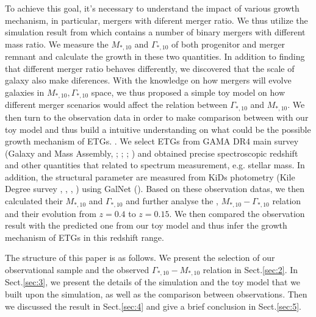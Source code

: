 \documentclass[fleqn,usenatbib]{mnras}
\begin{document}
\par To achieve this goal, it's necessary to understand the impact of various growth mechanism, in particular, mergers with diferent merger ratio.
 We thus utilize the simulation result from \cite{nipoti2009} which contains a number of binary mergers with different mass ratio. We measure the $M_{*,10}$ and $\Gamma_{*,10}$ of both progenitor and merger remnant and calculate the growth in these two quantities. In addition to finding that different merger ratio behaves differently, we discovered that the scale of galaxy also make diferences. With the knowledge on how mergers will evolve galaxies in $M_{*,10}, \Gamma_{*,10}$ space, we thus proposed a simple toy model on how different merger scenarios would affect the relation between $\Gamma_{*,10}$ and $M_{*,10}$. We then turn to the observation data in order to make comparison between with our toy model and thus build a intuitive understanding on what could be the possible growth mechanism of ETGs. 
 . We select ETGs from GAMA DR4 main survey (Galaxy and Mass Assembly, \cite{GAMAmain};\cite{bellstedt_galaxy_2020} ; \cite{GAMA1}; \cite{GAMA2}) and obtained precise spectroscopic redshift and other quantities that related to spectrum measurement, e.g. stellar mass. In addition, 
the structural parameter are measured from KiDs photometry (Kile Degree survey , \cite{kuijken_fourth_2019}, \cite{KiDs_Roy}, \cite{Amaro_rejection_2021}) using GalNet (\cite{GaLNet2022}). Based on these observation datas,  we then calculated their $M_{*,10} $ and $\Gamma_{*,10}$ and further analyse the , $M_{*,10} - \Gamma_{*,10}$ relation and their evolution from $z = 0.4$ to $z = 0.15$. We then compared the observation result with the predicted one from our toy model and thus infer the growth mechanism of ETGs in this redshift range.
\par The structure of this paper is as follows. We present the selection of our observational sample and the observed $\Gamma_{*,10} - M_{*,10}$ relation in Sect.\ref{sec:2}. In Sect.\ref{sec:3}, we present the details of the simulation and the toy model that we built upon the simulation, as well as the comparison between observations. Then we discussed the result in Sect.\ref{sec:4} and give a brief conclusion in Sect.\ref{sec:5}.
\end{document}
